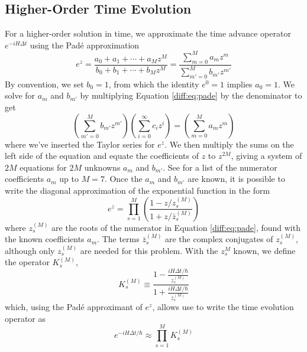 \documentclass[11pt, a4paper]{article}
\begin{document}
\subsection{Higher-Order Time Evolution}\label{diff:ss:CN-time}
For a higher-order solution in time, we approximate the time advance operator $ e^{-iH\Delta t} $ using the Pad\'{e} approximation
\begin{equation}
	e^{z} = \frac{a_{0} + a_{1} + \cdots + a_{M}z^{M}}{b_{0} + b_{1} + \cdots + b_{M}z^{M}} = \frac{\sum_{m=0}^{M}a_{m}z^{m}}{\sum_{m'=0}^{M}b_{m'}z^{m'}} \label{diff:eq:pade}
\end{equation}
By convention, we set $ b_{0} = 1 $, from which the identity $ e^{0} = 1 $ implies $ a_{0} = 1 $. We solve for $ a_{m} $ and $ b_{m'} $ by multiplying Equation \ref{diff:eq:pade}  by the denominator to get
\begin{equation*}
	\left(\sum_{m'=0}^{M}b_{m'}z^{m'}\right)\left(\sum_{i=0}^{\infty}c_{i}z^{i}\right) = \left(\sum_{m=0}^{M}a_{m}z^{m}\right)
\end{equation*}
where we've inserted the Taylor series for $ e^{z} $. We then multiply the sums on the left side of the equation and equate the coefficients of $ z $ to $ z^{2M} $, giving a system of $ 2M $ equations for $ 2M $ unknowns $ a_{m} $ and $ b_{m'} $. See \cite{oes-exp} for a list of the numerator coefficients $ a_{m} $ up to $ M = 7 $. Once the $ a_{m} $ and $ b_{m'} $ are known, it is possible to write the diagonal approximation of the exponential function in the form
\begin{equation*}
	e^{z} = \prod_{s=1}^{M}\left(\frac{1 - z/z_{s}^{(M)}}{1 + z/\bar{z}_{s}^{(M)}}\right)
\end{equation*}
where $ z_{s}^{(M)} $ are the roots of the numerator in Equation \ref{diff:eq:pade}, found with the known coefficients $ a_{m} $. The terms $ \bar{z}_{s}^{(M)} $ are the complex conjugates of $ z_{s}^{(M)} $, although only $ z_{s}^{(M)} $ are needed for this problem. With the $ z_{s}^{M} $ known, we define the operator $ K_{s}^{(M)} $,
\begin{equation*}
	K_{s}^{(M)} \equiv \frac{1 - \frac{iH\Delta t/\hbar}{z_{s}^{(M)}}}{1 + \frac{iH\Delta t/\hbar}{\bar{z}_{s}^{(M)}}}
\end{equation*}
which, using the Pad\'{e} approximant of $ e^{z} $, allows use to write the time evolution operator as
\begin{equation*}
	e^{-iH\Delta t / \hbar} \approx \prod_{s=1}^{M}K_{s}^{(M)}
\end{equation*}
\end{document}
